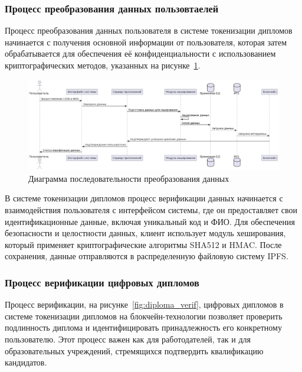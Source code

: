 \subsubsection{Процесс преобразования данных пользовтаелей}

Процесс преобразования данных пользователя в системе токенизации дипломов начинается с получения основной информации от пользователя, которая затем обрабатывается для обеспечения её конфиденциальности с использованием криптографических методов, указанных на рисунке~\ref{fig:data_proc}.

\begin{figure}[H]
	\centering
	\includegraphics[width=\textwidth]{images/2.data_proc.png}
	\parskip=6pt
	\caption{Диаграмма последовательности преобразования данных}
	\label{fig:data_proc}
\end{figure}

В системе токенизации дипломов процесс верификации данных начинается с взаимодействия пользователя с интерфейсом системы, где он предоставляет свои идентификационные данные, включая уникальный код и ФИО. Для обеспечения безопасности и целостности данных, клиент использует модуль хеширования, который применяет криптографические алгоритмы SHA512 и HMAC. После сохранения, данные отправляются в распределенную файловую систему IPFS.

\subsubsection{Процесс верификации цифровых дипломов}

Процесс верификации, на рисунке~\ref{fig:diploma_verif}, цифровых дипломов в системе токенизации дипломов на блокчейн-технологии позволяет проверить подлинность диплома и идентифицировать принадлежность его конкретному пользователю. Этот процесс важен как для работодателей, так и для образовательных учреждений, стремящихся подтвердить квалификацию кандидатов.


